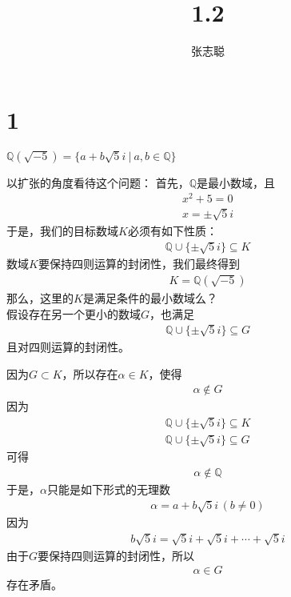 \documentclass{article}
\begin{document}
\title{1.2}
\author{张志聪}
\maketitle

\section*{1}

$\mathbb{Q}(\sqrt{-5}) = \{a + b\sqrt{5}i \ | \  a, b \in \mathbb{Q}\}$

以扩张的角度看待这个问题：
首先，$\mathbb{Q}$是最小数域，且
\begin{align*}
  x^2 + 5 = 0 \\
  x = \pm \sqrt{5}i
\end{align*}
于是，我们的目标数域$K$必须有如下性质：
\begin{align*}
  \mathbb{Q} \cup \{\pm \sqrt{5}i\} \subseteq K
\end{align*}
数域$K$要保持四则运算的封闭性，我们最终得到
\begin{align*}
  K = \mathbb{Q}(\sqrt{-5})
\end{align*}
那么，这里的$K$是满足条件的最小数域么？\\
假设存在另一个更小的数域$G$，也满足
\begin{align*}
  \mathbb{Q} \cup \{\pm \sqrt{5}i\} \subseteq G
\end{align*}
且对四则运算的封闭性。

因为$G \subset K$，所以存在$\alpha \in K$，使得
\begin{align*}
  \alpha \notin G
\end{align*}
因为
\begin{align*}
  \mathbb{Q} \cup \{\pm \sqrt{5}i\} \subseteq K \\
  \mathbb{Q} \cup \{\pm \sqrt{5}i\} \subseteq G 
\end{align*}
可得
\begin{align*}
  \alpha \notin \mathbb{Q}
\end{align*}
于是，$\alpha$只能是如下形式的无理数
\begin{align*}
  \alpha = a + b\sqrt{5}i \, (b \neq 0)
\end{align*}
因为
\begin{align*}
  b\sqrt{5}i = \sqrt{5}i + \sqrt{5}i + \cdots + \sqrt{5}i 
\end{align*}
由于$G$要保持四则运算的封闭性，所以
\begin{align*}
  \alpha \in G
\end{align*}
存在矛盾。
\end{document}
